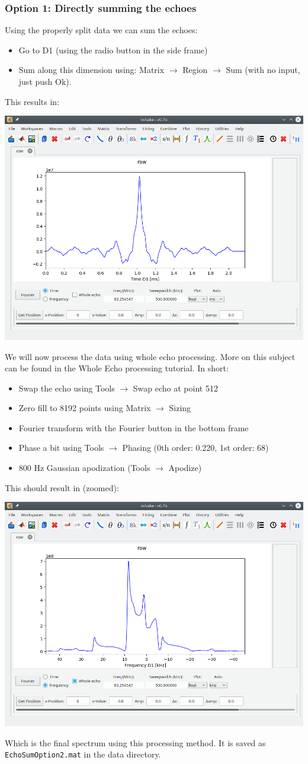 \documentclass[11pt,a4paper]{article}
\begin{document}
\subsubsection{Option 1: Directly summing the echoes}
Using the properly split data we can sum the echoes:
\begin{itemize}
  \item Go to D1 (using the radio button in the side frame)
  \item Sum along this dimension using: Matrix $\longrightarrow$ Region $\longrightarrow$ Sum (with no input, just push Ok).
\end{itemize}
This results in:
\begin{center}
\includegraphics[width=0.7\linewidth]{Figs/Fig5.png}
\end{center}

We will now process the data using whole echo processing.
More on this subject can be found in the Whole Echo processing tutorial.
In short:
\begin{itemize}
  \item Swap the echo using Tools $\longrightarrow$ Swap echo at point 512
  \item Zero fill to 8192 points using Matrix $\longrightarrow$ Sizing
  \item Fourier transform with the Fourier button in the bottom frame
  \item Phase a bit using Tools $\longrightarrow$ Phasing (0th order: 0.220, 1st order: 68)
  \item 800 Hz Gaussian apodization (Tools $\longrightarrow$ Apodize)
\end{itemize}
This should result in (zoomed):
\begin{center}
\includegraphics[width=0.7\linewidth]{Figs/Fig6.png}
\end{center}
Which is the final spectrum using this processing method.
It is saved as \texttt{EchoSumOption2.mat} in the data directory.
\end{document}
